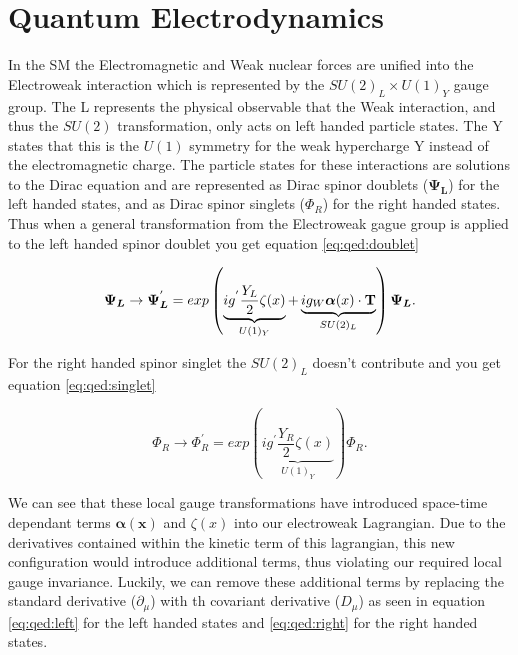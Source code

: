 \section{Quantum Electrodynamics} \label{sec:theory:qed}

In the SM the Electromagnetic and Weak nuclear forces are unified into the
Electroweak interaction which is represented by the $SU(2)_L \times U(1)_Y$
gauge group. The L represents the physical observable that the Weak interaction,
and thus the $SU(2)$ transformation, only acts on left handed particle states.
The Y states that this is the $U(1)$ symmetry for the weak hypercharge Y instead
of the electromagnetic charge.  The particle states for these interactions are
solutions to the Dirac equation and are represented as Dirac spinor doublets
($\boldsymbol{\Psi_L}$) for the left handed states, and as Dirac spinor singlets
($\Phi_R$) for the right handed states.  Thus when a general transformation from
the Electroweak gague group is applied to the left handed spinor doublet you get
equation \ref{eq:qed:doublet}

\begin{equation} \label{eq:qed:doublet} 
\boldsymbol{\Psi_L} \rightarrow \boldsymbol{\Psi_L}^{'} = exp \left(
\underbrace{ ig^{'} \frac{Y_L}{2}
\zeta (x) }_{U(1)_Y} + \underbrace{ ig_{W} \boldsymbol{\alpha}(x) \cdot
\text{\bf{T}} }_{SU(2)_L} \right) \boldsymbol{\Psi_L}.
\end{equation}

For the right handed spinor singlet the $SU(2)_L$ doesn't contribute and
you get equation \ref{eq:qed:singlet}

\begin{equation} \label{eq:qed:singlet} 
{\Phi_R} \rightarrow \Phi_R^{'} = exp \left( \underbrace{ ig^{'} \frac{Y_R}{2}
\zeta (x) }_{U(1)_Y} \right) \Phi_R.
\end{equation}

We can see that these local gauge transformations have introduced space-time
dependant terms $\boldsymbol{\alpha(x)}$ and $\zeta(x)$ into our electroweak
Lagrangian.  Due to the derivatives contained within the kinetic term of this
lagrangian, this new configuration would introduce additional terms, thus
violating our required local gauge invariance.  Luckily, we can remove these
additional terms by replacing the standard derivative ($\partial_{\mu}$) with th
covariant derivative ($D_{\mu}$) as seen in equation \ref{eq:qed:left} for the
left handed states and \ref{eq:qed:right} for the right handed states.

